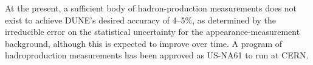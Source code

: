 At the present, a sufficient body of hadron-production
measurements does not exist to achieve DUNE's desired accuracy of
4--5\%, as determined by the irreducible error on the statistical
uncertainty for the appearance-measurement background, although this
is expected to improve over time. A program of hadroproduction
measurements has been approved as US-NA61 to run at CERN.


%
%
%
%
%

